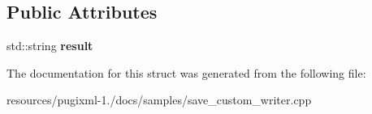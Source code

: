 \subsection*{Public Attributes}
\begin{DoxyCompactItemize}
\item 
\hypertarget{structxml__string__writer_a5ffa421ce629a062ca975f5967fef5f7}{std\+::string {\bfseries result}}\label{structxml__string__writer_a5ffa421ce629a062ca975f5967fef5f7}

\end{DoxyCompactItemize}


The documentation for this struct was generated from the following file\+:\begin{DoxyCompactItemize}
\item 
resources/pugixml-\/1./docs/samples/save\+\_\+custom\+\_\+writer.\+cpp\end{DoxyCompactItemize}

